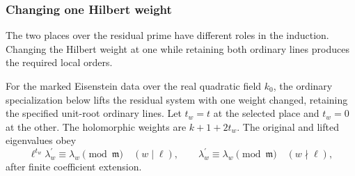 \subsubsection{Changing one Hilbert weight}
\label{par:mixed-hilbert}

The two places over the residual prime have different roles in the induction. Changing the Hilbert weight at one while retaining both ordinary lines produces the required local orders.

\begin{proposition}\label{prop:mixed-hilbert-lift}
For the marked Eisenstein data over the real quadratic field
\(k_0\), the ordinary specialization below lifts the residual
system with one weight changed, retaining the specified unit-root
ordinary lines. Let \(t_w=t\) at the selected place and \(t_w=0\) at the other. The holomorphic weights are \(k+1+2t_w\). The original and lifted eigenvalues obey 
\[
 \ell^{t_w}\lambda^{\prime}_w\equiv\lambda_w\pmod{\mathfrak m}\quad(w\mid\ell),\qquad \lambda^{\prime}_w\equiv\lambda_w\pmod{\mathfrak m}\quad(w\nmid\ell),
\]
 after finite coefficient extension.
\end{proposition}

